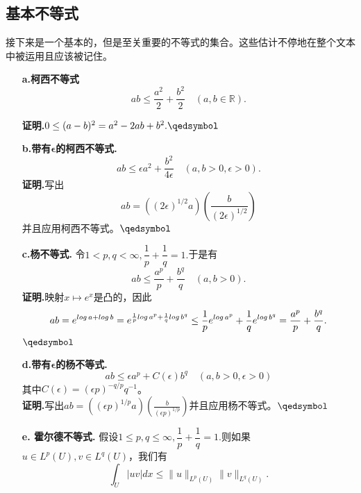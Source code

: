\documentclass[leqno]{article}%
\begin{document}
\subsection{基本不等式}
接下来是一个基本的，但是至关重要的不等式的集合。这些估计不停地在整个文本中被运用且应该被记住。
\begin{enumerate}[fullwidth,itemindent=0em]
 \item[\textbf{a.柯西不等式}]
  \begin{equation}
  ab\leq \dfrac{a^2}{2}+\dfrac{b^2}{2}\quad(a,b\in\mathbb{R}).
  \end{equation}
	\raggedright \textbf{证明.}$0\leq(a-b)^2=a^2-2ab+b^2.\hfill\qedsymbol$
 \item[\textbf{b.带有$\mathbf{\epsilon}$的柯西不等式.}]
  \begin{equation}
  ab\leq \epsilon a^{2}+\dfrac{b^{2}}{4\epsilon}\quad(a,b>0,\epsilon>0).
  \end{equation}
 	\textbf{证明.}写出
 	\begin{equation*}
 	ab=((2\epsilon)^{1/2}a)\left(\dfrac{b}{(2\epsilon)^{1/2}}\right)
 	\end{equation*}
 	并且应用柯西不等式。$\hfill\qedsymbol$
 \item[\textbf{c.杨不等式.}]
 令$1<p,q<\infty,\dfrac{1}{p}+\dfrac{1}{q}=1.$于是有
 \begin{equation}
 ab\leq\dfrac{a^p}{p}+\dfrac{b^q}{q}\quad (a,b>0).
 \end{equation}
 \textbf{证明.}映射$x\mapsto e^x$是凸的，因此
 \begin{equation*}
 ab=e^{\small{log\,a+log\,b}}=e^{\frac{1}{p}log\,a^p+\frac{1}{q}log\,b^q}\leq\frac{1}{p}e^{log\,a^p}+\dfrac{1}{q}e^{log\,b^q}=\dfrac{a^p}{p}+\dfrac{b^q}{q}.
 \end{equation*}
 $\hfill\qedsymbol$
\item[\textbf{d.带有$\mathbf{\epsilon}$的杨不等式.}]
\begin{equation}
ab\leq\epsilon a^p+C(\epsilon)b^q\quad (a,b>0,\epsilon>0)
\end{equation}
其中$C(\epsilon)=(\epsilon p)^{-q/p}q^{-1}$。\\
\textbf{证明.}写出$ab=((\epsilon p)^{1/p}a)\left(\frac{b}{(\epsilon p)^{1/p}}\right)$并且应用杨不等式。$\hfill\qedsymbol$
\item[\textbf{e. 霍尔德不等式.}]假设$1\leq p,q\leq\infty,\dfrac{1}{p}+\dfrac{1}{q}=1.$则如果$u\in L^{p}(U),v\in L^{q}(U)$，我们有
\begin{equation}
\int_{U}|uv|dx\leq\| u\|_{L^{p}(U)}\| v\|_{L^{q}(U)}.
\end{equation}

\end{enumerate}
\end{document}

